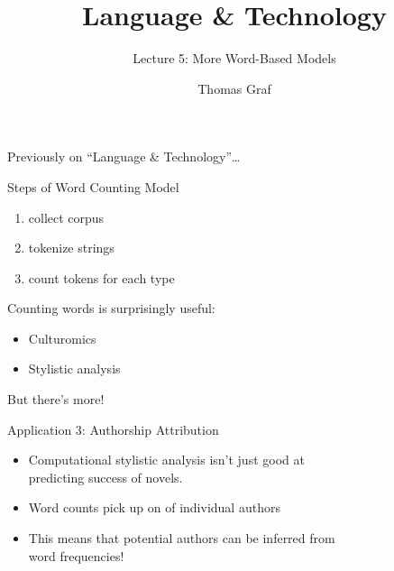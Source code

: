 \documentclass[professionalfonts, xcolor={usenames,svgnames,x11names,table}]{beamer}
\title{\texorpdfstring{Language \& Technology}{Language and Technology}}
\subtitle{Lecture 5: More Word-Based Models}
\author{Thomas Graf}
\institute{Stony Brook University\\\texttt{lin120@thomasgraf.net}}
\date{}
\begin{document}
\unnumbered{
\begin{frame}
	\titlepage
\end{frame}
}

\begin{frame}{Previously on ``Language \& Technology''\ldots}
    \begin{block}{Steps of Word Counting Model}
        \begin{enumerate}
            \item collect corpus
            \item tokenize strings
            \item count tokens for each type
        \end{enumerate}
    \end{block}

    \pause
    Counting words is surprisingly useful:
    \begin{itemize}
        \item Culturomics
        \item Stylistic analysis
    \end{itemize}
    But there's more!
\end{frame}

\begin{frame}{Application 3: Authorship Attribution}
    \begin{itemize}
        \item Computational stylistic analysis isn't just good at\\
            predicting success of novels.
        \item Word counts pick up on  of individual authors
        \item This means that potential authors can be inferred from\\
             word frequencies!
    \end{itemize}
\end{frame}
\end{document}
